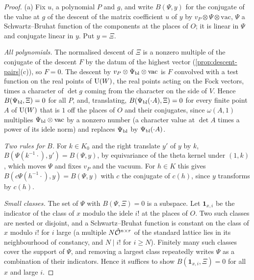 \begin{proof}
(a) Fix $u$, a polynomial $P$ and $g$, and write $B(\Psi,y)$ for the conjugate of the value at $g$ of the descent of the matrix coefficient $u$ of $y$ by $v_P\otimes\Psi\otimes\mathrm{vac}$, $\Psi$ a Schwartz--Bruhat function of
the components at the places of $O$; it is linear in $\Psi$ and conjugate linear in $y$. Put $y=\Xi$.

\emph{All polynomials.} The normalised descent of $\Xi$ is a nonzero multiple of the conjugate of the descent $F$ by the datum of the highest vector (\cref{prop:descent-pairs}(c)), so $F=0$. The descent by $v_P\otimes\Psi_{\rm bl}\otimes\mathrm{vac}$
is $F$ convolved with a test function on the real points of $\operatorname{U}(W)$, the real points acting on the Fock vectors, times a character of $\det g$ coming from the character on the side of $V$. Hence $B(\Psi_{\rm bl},\Xi)=0$ for all $P$,
and, translating, $B(\Psi_{\rm bl}(\cdot A),\Xi)=0$ for every finite point $A$ of $\operatorname{U}(W)$ that is $1$ off the places of $O$ and their conjugates, since $\omega(A,1)$ multiplies $\Psi_{\rm bl}\otimes\mathrm{vac}$ by a nonzero
number (a character value at $\det A$ times a power of its idele norm) and replaces $\Psi_{\rm bl}$ by $\Psi_{\rm bl}(\cdot A)$.

\emph{Two rules for $B$.} For $k\in K_0$ and the right translate $y'$ of $y$ by $k$, $B(\Psi(k^{-1}\cdot),y')=B(\Psi,y)$, by equivariance of the theta kernel under $(1,k)$, which moves $\Psi$ and fixes $v_P$ and the vacuum. For
$h\in K$ this gives $B(c\Psi(h^{-1}\cdot),y)=B(\Psi,y)$ with $c$ the conjugate of $c(h)$, since $y$ transforms by $c(h)$.

\emph{Small classes.} The set of $\Psi$ with $B(\Psi,\Xi)=0$ is a subspace. Let $\mathbf 1_{x,i}$ be the indicator of the class of $x$ modulo the idele $i!$ at the places of $O$. Two such classes are nested or disjoint, and
a Schwartz--Bruhat function is constant on the class of $x$ modulo $i!$ for $i$ large (a multiple $N\hat{\mathcal{O}}^{n\times r}$ of the standard lattice lies in its neighbourhood of constancy, and $N\mid i!$ for $i\ge N$). Finitely many such
classes cover the support of $\Psi$, and removing a largest class repeatedly writes $\Psi$ as a combination of their indicators. Hence it suffices to show $B(\mathbf 1_{x,i},\Xi)=0$ for all $x$ and large $i$.


\end{proof}
